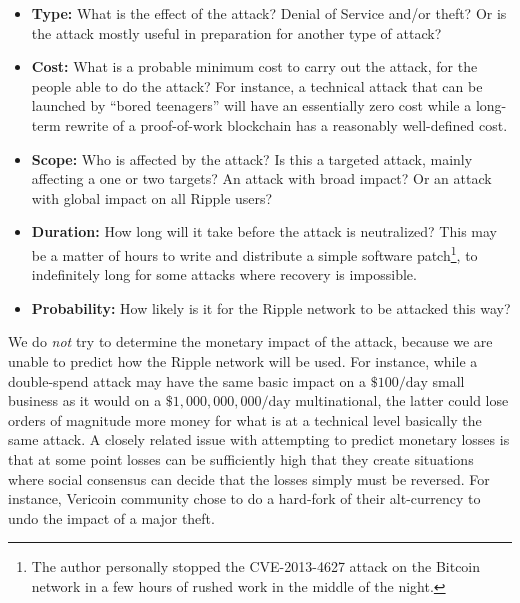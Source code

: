 \documentclass{article}
\begin{document}
\begin{itemize}

    \item \textbf{Type:} What is the effect of the attack? Denial of Service
          and/or theft? Or is the attack mostly useful in preparation for another
          type of attack?

    \item \textbf{Cost:} What is a probable minimum cost to carry out the attack, for
          the people able to do the attack? For instance, a technical attack
          that can be launched by ``bored teenagers'' will have an essentially
          zero cost while a long-term rewrite of a proof-of-work blockchain has
          a reasonably well-defined cost.

    \item \textbf{Scope:} Who is affected by the attack? Is this a targeted attack,
          mainly affecting a one or two targets? An attack with broad impact? Or
          an attack with global impact on all Ripple users?

    \item \textbf{Duration:} How long will it take before the attack is
          neutralized?  This may be a matter of hours to write and distribute a
          simple software patch\footnote{The author personally stopped the
          CVE-2013-4627 attack on the Bitcoin network in a few hours of rushed
          work in the middle of the night.}, to indefinitely long for some
          attacks where recovery is impossible.

    \item \textbf{Probability:} How likely is it for the Ripple network to be
          attacked this way?

\end{itemize}

We do \emph{not} try to determine the monetary impact of the attack, because we
are unable to predict how the Ripple network will be used. For instance, while
a double-spend attack may have the same basic impact on a $\$100/\text{day}$
small business as it would on a $\$1,000,000,000/\text{day}$ multinational, the
latter could lose orders of magnitude more money for what is at a technical
level basically the same attack. A closely related issue with attempting to predict
monetary losses is that at some point losses can be sufficiently high that they
create situations where social consensus can decide that the losses simply must
be reversed. For instance, Vericoin community chose to do a hard-fork of their
alt-currency to undo the impact of a major theft.\cite{coindesk-vericoin}
\end{document}
